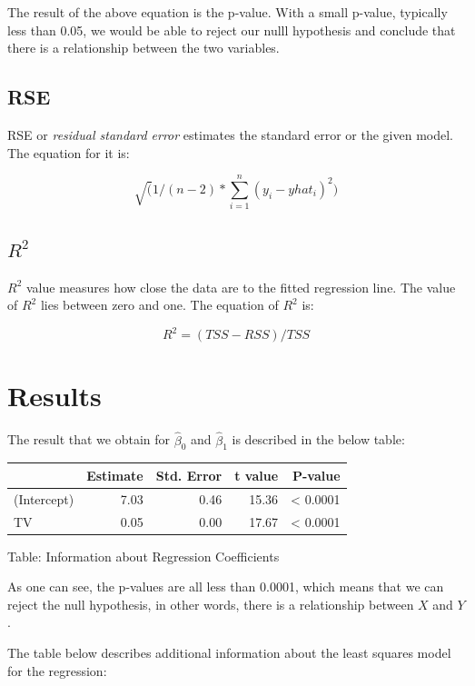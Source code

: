 \documentclass{article}
\begin{document}
The result of the above equation is the p-value. With a small p-value, typically less than 0.05, we would be able to reject our nulll hypothesis and conclude that there is a relationship between the two variables.

\subsection{RSE}

RSE or \emph{residual standard error} estimates the standard error or the given model. The equation for it is:

\begin{equation}
\sqrt( 1/ (n-2) * \sum_{i=1}^n (y_i - yhat_i)^2)
\end{equation}

\subsection{$R^2$}

$R^2$ value measures how close the data are to the fitted regression line. The value of $R^2$ lies between zero and one. The equation of $R^2$ is:

\begin{equation}
R^2 = (TSS - RSS) / TSS
\end{equation}

\section{Results}

The result that we obtain for $\hat{\beta}_0$ and $\hat{\beta}_1$ is described in the below table:

\begin{tabular}{|l|r|r|r|r|} \hline
\bf         & Estimate & Std. Error & t value & P-value  \\\hline
(Intercept) & 7.03     & 0.46       & 15.36   & < 0.0001 \\
TV          & 0.05     & 0.00       & 17.67   & < 0.0001 \\\hline
\end{tabular}

Table: Information about Regression Coefficients

As one can see, the p-values are all less than 0.0001, which means that we can reject the null hypothesis, in other words, there is a relationship between $X$ and 
$Y$.

The table below describes additional information about the least squares model for the regression:
\end{document}
